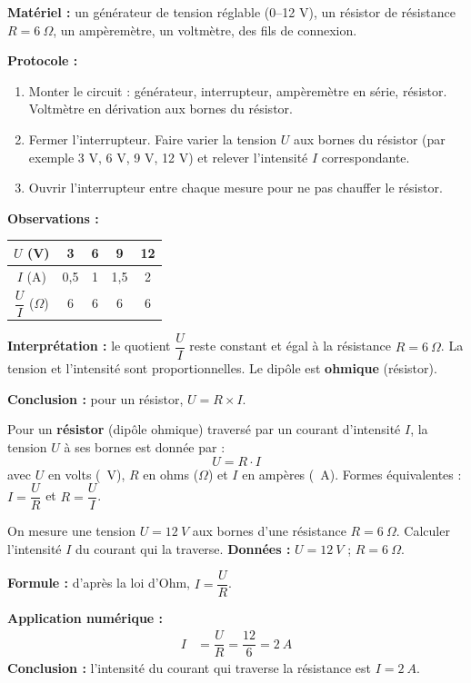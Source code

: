 \documentclass[11pt]{article}
\begin{document}
\begin{experience}
\textbf{Matériel :} un générateur de tension réglable (0--12 V), un résistor de résistance $R = \SI{6}{\Omega}$, un ampèremètre, un voltmètre, des fils de connexion.

\textbf{Protocole :}
\begin{enumerate}
\item Monter le circuit : générateur, interrupteur, ampèremètre en série, résistor. Voltmètre en dérivation aux bornes du résistor.
\item Fermer l'interrupteur. Faire varier la tension $U$ aux bornes du résistor (par exemple 3 V, 6 V, 9 V, 12 V) et relever l'intensité $I$ correspondante.
\item Ouvrir l'interrupteur entre chaque mesure pour ne pas chauffer le résistor.
\end{enumerate}

\textbf{Observations :}
\begin{center}
\begin{tabular}{|c|c|c|c|c|}
\hline
\rowcolor{popblueL} $U$ (V) & 3 & 6 & 9 & 12 \\
\hline
$I$ (A) & 0,5 & 1 & 1,5 & 2 \\
\hline
$\dfrac{U}{I}$ ($\Omega$) & 6 & 6 & 6 & 6 \\
\hline
\end{tabular}
\end{center}

\textbf{Interprétation :} le quotient $\dfrac{U}{I}$ reste constant et égal à la résistance $R = \SI{6}{\Omega}$. La tension et l'intensité sont proportionnelles. Le dipôle est \textbf{ohmique} (résistor).

\textbf{Conclusion :} pour un résistor, $U = R \times I$.
\end{experience}

\begin{propriete}
Pour un \textbf{résistor} (dipôle ohmique) traversé par un courant d'intensité $I$, la tension $U$ à ses bornes est donnée par :
\[ U = R \cdot I \]
avec $U$ en volts (\SI{}{V}), $R$ en ohms ($\Omega$) et $I$ en ampères (\SI{}{A}).
Formes équivalentes : $I = \dfrac{U}{R}$ et $R = \dfrac{U}{I}$.
\end{propriete}

\begin{exoresolu}
On mesure une tension $U = \SI{12}{V}$ aux bornes d'une résistance $R = \SI{6}{\Omega}$. Calculer l'intensité $I$ du courant qui la traverse.
\tcblower
\textbf{Données :} $U = \SI{12}{V}$ ; $R = \SI{6}{\Omega}$.

\textbf{Formule :} d'après la loi d'Ohm, $I = \dfrac{U}{R}$.

\textbf{Application numérique :}
\begin{align*}
I &= \dfrac{U}{R} = \dfrac{12}{6} = \SI{2}{A}
\end{align*}
\textbf{Conclusion :} l'intensité du courant qui traverse la résistance est $I = \SI{2}{A}$.
\end{exoresolu}
\end{document}
